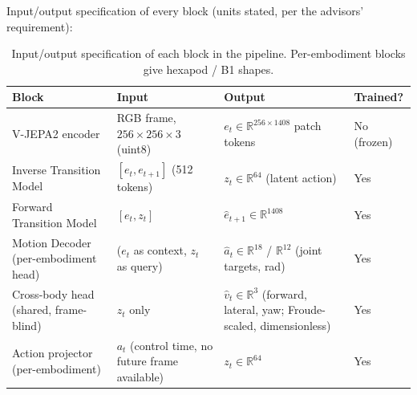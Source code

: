 \documentclass[12pt,a4paper,oneside]{report}
\begin{document}
Input/output specification of every block (units stated, per the advisors' requirement):

\begin{table}[H]
\centering
\footnotesize
\setlength{\tabcolsep}{4pt}
\caption{Input/output specification of each block in the pipeline. Per-embodiment blocks give hexapod / B1 shapes.}
\label{tab:io}
\begin{tabularx}{\textwidth}{>{\hsize}Y>{\hsize}Y>{\hsize}Y>{\hsize}Y}
\hline
\textbf{Block} & \textbf{Input} & \textbf{Output} & \textbf{Trained?}\\
\hline
V-JEPA2 encoder & RGB frame, $256\times256\times3$ (uint8) & $e_t \in \mathbb{R}^{256\times1408}$ patch tokens & No (frozen)\\
Inverse Transition Model & $[e_t, e_{t+1}]$ (512 tokens) & $z_t \in \mathbb{R}^{64}$ (latent action) & Yes\\
Forward Transition Model & $[e_t, z_t]$ & $\hat{e}_{t+1} \in \mathbb{R}^{1408}$ & Yes\\
Motion Decoder (per-embodiment head) & ($e_t$ as context, $z_t$ as query) & $\hat{a}_t \in \mathbb{R}^{18}$ /
  $\mathbb{R}^{12}$ (joint targets, rad) & Yes\\
Cross-body head (shared, frame-blind) & $z_t$ only & $\hat{v}_t \in \mathbb{R}^3$ (forward, lateral, yaw;
  Froude-scaled, dimensionless) & Yes\\
Action projector (per-embodiment) & $a_t$ (control time, no future frame available) & $z_t \in \mathbb{R}^{64}$ & Yes\\
\hline
\end{tabularx}
\end{table}
\end{document}
